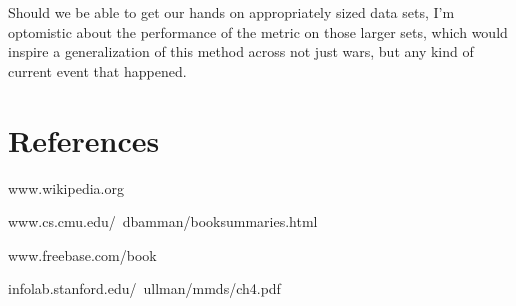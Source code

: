 \documentclass[twoside]{article}
\begin{document}
\begin{multicols}{2}
Should we be able to get our hands on appropriately sized data sets, I'm optomistic about the performance of the metric on those larger sets, which would inspire a generalization of this method across not just wars, but any kind of current event that happened. 

\section{References}
\centering
    www.wikipedia.org
    
    www.cs.cmu.edu/~dbamman/booksummaries.html 
    
    www.freebase.com/book
    
    infolab.stanford.edu/~ullman/mmds/ch4.pdf
    
\end{multicols}
\end{document}
